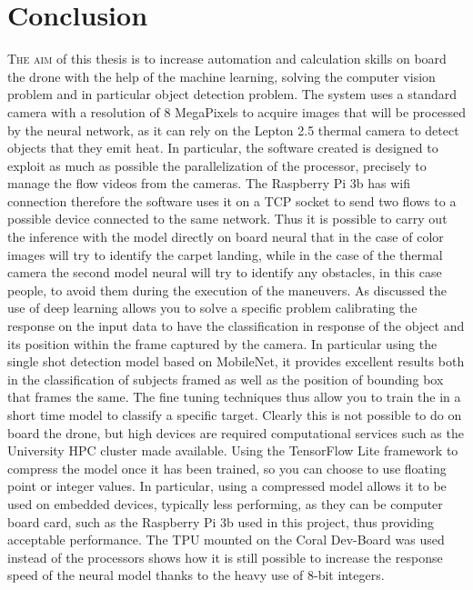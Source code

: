 \chapter{Conclusion}
\label{chap:conclusion}
%
\lettrine[lines=3]{T}{he aim} of this thesis is to increase automation and 
calculation skills on board the drone with the help of the machine learning, 
solving the computer vision problem and in particular object detection problem. 
The system uses a standard camera with a resolution of 8 MegaPixels to acquire 
images that will be processed by the neural network, as it can rely on the
Lepton 2.5 thermal camera to detect objects that they emit heat. 
In particular, the software created is designed to exploit as much as possible
the parallelization of the processor, precisely to manage the flow videos from
the cameras. The Raspberry Pi 3b has wifi connection therefore the software uses
it on a TCP socket to send two flows to a possible device connected to the same
network. 
Thus it is possible to carry out the inference with the model directly on board
neural that in the case of color images will try to identify the carpet landing,
while in the case of the thermal camera the second model neural will try to
identify any obstacles, in this case people, to avoid them during the execution
of the maneuvers. 
As discussed the use of deep learning allows you to solve a specific problem
calibrating the response on the input data to have the classification in
response of the object and its position within the frame captured by the camera.
In particular using the single shot detection model based on MobileNet, it
provides excellent results both in the classification of subjects framed as well
as the position of bounding box that frames the same. 
The fine tuning techniques thus allow you to train the in a short time model to
classify a specific target. Clearly this is not possible to do on board the
drone, but high devices are required computational services such as the
University HPC cluster made available. Using the TensorFlow Lite framework to
compress the model once it has been trained, so you can choose to use floating
point or integer values. 
In particular, using a compressed model allows it to be used on embedded
devices, typically less performing, as they can be computer board card, such as
the Raspberry Pi 3b used in this project, thus providing acceptable performance.
The TPU mounted on the Coral Dev-Board  was used instead of the processors shows
how it is still possible to increase the response speed of the neural model
thanks to the heavy use of 8-bit integers. 
